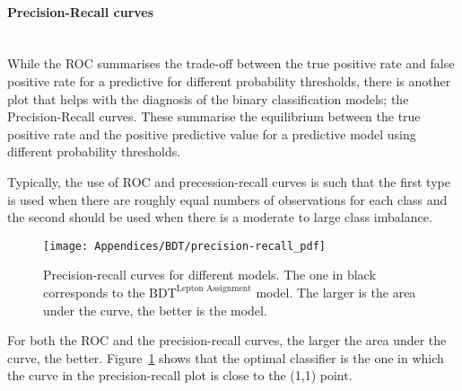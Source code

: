 
\paragraph{Precision-Recall curves}\mbox{}\\
While the ROC summarises the trade-off between 
the true positive rate and false positive rate for a predictive 
for different probability thresholds, there is another plot that helps
with the diagnosis of the binary classification models; the Precision-Recall curves.
These summarise the equilibrium between the true positive rate and 
the positive predictive value for a predictive model using different probability thresholds.

Typically, the use of ROC and precession-recall curves is such that the first type is used
when there are roughly equal numbers of observations for each class and
the second should be used when there is a moderate to large class imbalance.

\begin{figure}[h]
\centering
  \centering
  \texttt{[image: Appendices/BDT/precision-recall\_pdf]}
\caption{Precision-recall curves for different models. The one in black corresponds to the
$\text{BDT}^{\text{Lepton Assignment}}$ model. The larger is the area under the curve,
the better is the model.}
\label{fig:Appendix:BDT:precision-recallCurve}
\end{figure}

For both the ROC and the precision-recall curves, the larger the area under the curve, the better.
Figure~\ref{fig:Appendix:BDT:precision-recallCurve} shows that the optimal classifier is the one in 
which the curve in the precision-recall plot is close to the (1,1) point.



